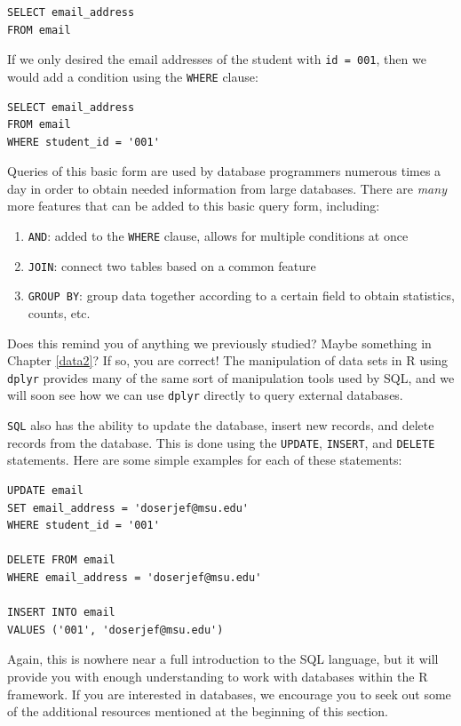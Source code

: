 \documentclass[
]{krantz}
\providecommand{\tightlist}{%
  \setlength{\itemsep}{0pt}\setlength{\parskip}{0pt}}
\begin{document}
\begin{verbatim}
SELECT email_address
FROM email
\end{verbatim}

If we only desired the email addresses of the student with \texttt{id\ =\ 001}, then we would add a condition using the \texttt{WHERE} clause:

\begin{verbatim}
SELECT email_address
FROM email
WHERE student_id = '001'
\end{verbatim}

Queries of this basic form are used by database programmers numerous times a day in order to obtain needed information from large databases. There are \emph{many} more features that can be added to this basic query form, including:

\begin{enumerate}
\def\labelenumi{\arabic{enumi}.}
\tightlist
\item
  \texttt{AND}: added to the \texttt{WHERE} clause, allows for multiple conditions at once
\item
  \texttt{JOIN}: connect two tables based on a common feature
\item
  \texttt{GROUP\ BY}: group data together according to a certain field to obtain statistics, counts, etc.
\end{enumerate}

Does this remind you of anything we previously studied? Maybe something in Chapter \ref{data2}? If so, you are correct! The manipulation of data sets in R using \texttt{dplyr} provides many of the same sort of manipulation tools used by SQL, and we will soon see how we can use \texttt{dplyr} directly to query external databases.

\texttt{SQL} also has the ability to update the database, insert new records, and delete records from the database. This is done using the \texttt{UPDATE}, \texttt{INSERT}, and \texttt{DELETE} statements. Here are some simple examples for each of these statements:

\begin{verbatim}
UPDATE email
SET email_address = 'doserjef@msu.edu'
WHERE student_id = '001'

DELETE FROM email
WHERE email_address = 'doserjef@msu.edu'

INSERT INTO email
VALUES ('001', 'doserjef@msu.edu')
\end{verbatim}

Again, this is nowhere near a full introduction to the SQL language, but it will provide you with enough understanding to work with databases within the R framework. If you are interested in databases, we encourage you to seek out some of the additional resources mentioned at the beginning of this section.
\end{document}
